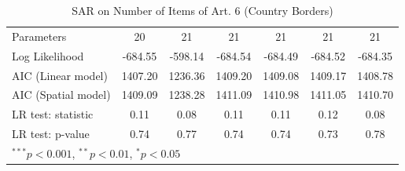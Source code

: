 \begin{table}[!h]
\begin{center}
\begin{tabular}{l c c c c c c }
Parameters              & 20           & 21            & 21           & 21           & 21           & 21           \\
Log Likelihood          & -684.55      & -598.14       & -684.54      & -684.49      & -684.52      & -684.35      \\
AIC (Linear model)      & 1407.20      & 1236.36       & 1409.20      & 1409.08      & 1409.17      & 1408.78      \\
AIC (Spatial model)     & 1409.09      & 1238.28       & 1411.09      & 1410.98      & 1411.05      & 1410.70      \\
LR test: statistic      & 0.11         & 0.08          & 0.11         & 0.11         & 0.12         & 0.08         \\
LR test: p-value        & 0.74         & 0.77          & 0.74         & 0.74         & 0.73         & 0.78         \\
\bottomrule
\multicolumn{7}{l}{\scriptsize{$^{***}p<0.001$, $^{**}p<0.01$, $^*p<0.05$}}
\end{tabular}
\caption{SAR on Number of Items of Art. 6 (Country Borders)}
\label{table:coefficients}
\end{center}
\end{table}
